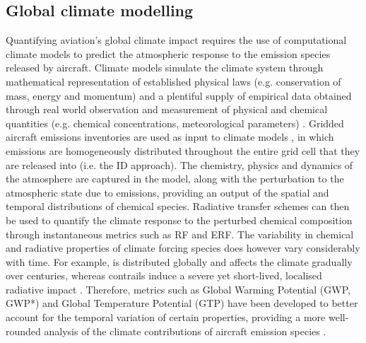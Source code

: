 \subsection{Global climate modelling}
\label{Climate_modelling}
Quantifying aviation's global climate impact requires the use of computational climate models to predict the atmospheric response to the emission species released by aircraft. Climate models simulate the climate system through mathematical representation of established physical laws (e.g. conservation of mass, energy and momentum) and a plentiful supply of empirical data obtained through real world observation and measurement of physical and chemical quantities (e.g. chemical concentrations, meteorological parameters) \cite{Randall2007}. Gridded aircraft emissions inventories are used as input to climate models \cite{Olsen2013, Wilkerson2010}, in which emissions are homogeneously distributed throughout the entire grid cell that they are released into (i.e. the ID approach). The chemistry, physics and dynamics of the atmosphere are captured in the model, along with the perturbation to the atmospheric state due to emissions, providing an output of the spatial and temporal distributions of chemical species. Radiative transfer schemes can then be used to quantify the climate response to the perturbed chemical composition through instantaneous metrics such as RF and ERF. The variability in chemical and radiative properties of climate forcing species does however vary considerably with time. For example,  is distributed globally and affects the climate gradually over centuries, whereas contrails induce a severe yet short-lived, localised radiative impact \cite{Lee2021}. Therefore, metrics such as Global Warming Potential (GWP, GWP*) and Global Temperature Potential (GTP) have been developed to better account for the temporal variation of certain properties, providing a more well-rounded analysis of the climate contributions of aircraft emission species \cite{Fuglestvedt2003, Fuglestvedt2010, Cain2019}.

